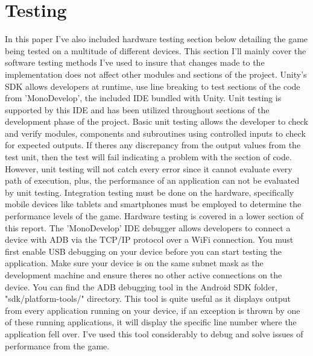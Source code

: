 \section{Testing}
In this paper I've also included hardware testing section below detailing the game being tested on a multitude of different devices. This section I'll mainly cover the software testing methods I've used to insure that changes made to the implementation does not affect other modules and sections of the project.
Unity's SDK allows developers at runtime, use line breaking to test sections of the code from 'MonoDevelop', the included IDE bundled with Unity. Unit testing is supported by this IDE and has been utilized throughout sections of the development phase of the project. Basic unit testing allows the developer to check and verify modules, components and subroutines using controlled inputs to check for expected outputs. If theres any discrepancy from the output values from the test unit, then the test will fail indicating a problem with the section of code. However, unit testing will not catch every error since it cannot evaluate every path of execution, plus, the performance of an application can not be evaluated by unit testing. Integration testing must be done on the hardware, specifically mobile devices like tablets and smartphones must be employed to determine the performance levels of the game. Hardware testing is covered in a lower section of this report.
The 'MonoDevelop' IDE debugger allows developers to connect a device with ADB via the TCP/IP protocol over a WiFi connection. You must first enable USB debugging on your device before you can start testing the application. Make sure your device is on the same subnet mask as the development machine and ensure theres no other active connections on the device. You can find the ADB debugging tool in the Android SDK folder, "sdk/platform-tools/" directory. This tool is quite useful as it displays output from every application running on your device, if an exception is thrown by one of these running applications, it will display the specific line number where the application fell over. I've used this tool considerably to debug and solve issues of performance from the game.
